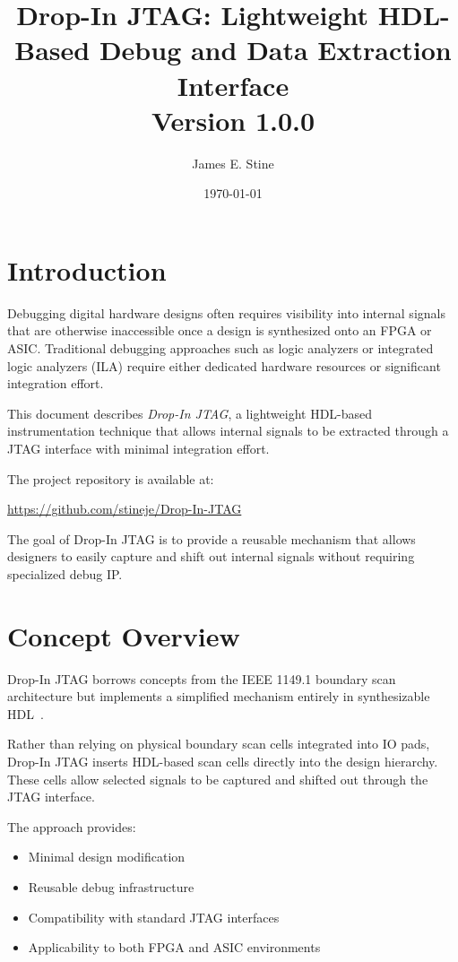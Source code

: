 \documentclass[10pt]{article}
\title{Drop-In JTAG: Lightweight HDL-Based Debug and Data Extraction Interface \\ Version 1.0.0}
\author{James E. Stine}
\date{\today}
\begin{document}
\maketitle

\section{Introduction}

Debugging digital hardware designs often requires visibility into internal signals that are otherwise inaccessible once a design is synthesized onto an FPGA or ASIC. Traditional debugging approaches such as logic analyzers or integrated logic analyzers (ILA) require either dedicated hardware resources or significant integration effort.

This document describes \textit{Drop-In JTAG}, a lightweight HDL-based instrumentation technique that allows internal signals to be extracted through a JTAG interface with minimal integration effort.

The project repository is available at:

\begin{center}
\url{https://github.com/stineje/Drop-In-JTAG}
\end{center}

The goal of Drop-In JTAG is to provide a reusable mechanism that allows designers to easily capture and shift out internal signals without requiring specialized debug IP.

\section{Concept Overview}

Drop-In JTAG borrows concepts from the IEEE 1149.1 boundary scan architecture but implements a simplified mechanism entirely in synthesizable HDL~\cite{ieee1149}.

Rather than relying on physical boundary scan cells integrated into IO pads, Drop-In JTAG inserts HDL-based scan cells directly into the design hierarchy. These cells allow selected signals to be captured and shifted out through the JTAG interface.

The approach provides:

\begin{itemize}
\item Minimal design modification
\item Reusable debug infrastructure
\item Compatibility with standard JTAG interfaces
\item Applicability to both FPGA and ASIC environments
\end{itemize}
\end{document}
